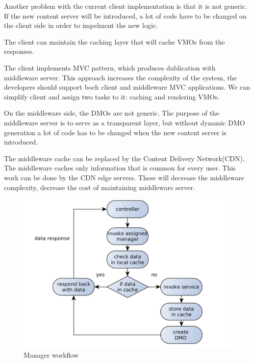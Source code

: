 Another problem with the current client implementation is that it is not generic. If the new content server will be introduced, a lot of code have to be changed on the client side in order to impelment the new logic.

The client can maintain the caching layer that will cache VMOs from the responses. 

The client implements MVC pattern, which produces dublication with middleware server. This approach increases the complexity of the system, the developers should support boch client and middleware MVC applications. We can simplify client and assign two tasks to it: caching and rendering VMOs.

On the middleware side, the DMOs are not generic. The purpose of the middleware server is to serve as a transparent layer, but without dynamic DMO generation a lot of code has to be changed when the new content server is introduced.

The middleware cache can be replaced by the Content Delivery Network(CDN). The middleware caches only information that is common for every user. This work can be done by the CDN edge servers. These will decrease the middleware complexity, decrease the cost of maintaining middleware server.

\begin{figure}[h]
    \centering
	\includegraphics[width=\textwidth]{images/via_manager_1.png}
    \caption{Manager workflow}
    \label{fig:via_manager}
\end{figure}

